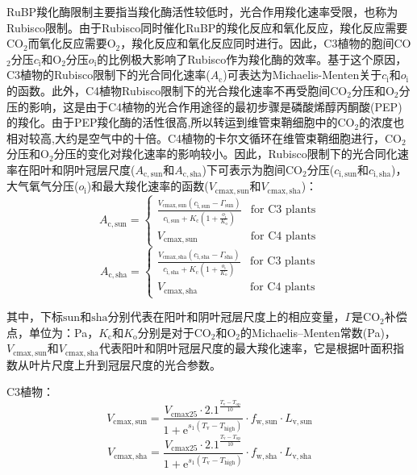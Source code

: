 RuBP羧化酶限制主要指当羧化酶活性较低时，光合作用羧化速率受限，也称为Rubisco限制。由于Rubisco同时催化RuBP的羧化反应和氧化反应，羧化反应需要CO$_2$而氧化反应需要O$_2$，羧化反应和氧化反应同时进行。因此，C3植物的胞间CO$_2$分压$c_{\mathrm {i}}$和O$_2$分压$o_{\mathrm {i}}$的比例极大影响了Rubisco作为羧化酶的效率。基于这个原因，C3植物的Rubisco限制下的光合同化速率($A_{\mathrm {c}}$)可表达为Michaelis-Menten关于$c_{\mathrm {i}}$和$o_{\mathrm {i}}$的函数。此外，C4植物Rubisco限制下的光合羧化速率不再受胞间CO$_2$分压和O$_2$分压的影响，这是由于C4植物的光合作用途径的最初步骤是磷酸烯醇丙酮酸(PEP)的羧化。由于PEP羧化酶的活性很高,所以转运到维管束鞘细胞中的CO$_2$的浓度也相对较高,大约是空气中的十倍。C4植物的卡尔文循环在维管束鞘细胞进行，CO$_2$分压和O$_2$分压的变化对羧化速率的影响较小。因此，Rubisco限制下的光合同化速率在阳叶和阴叶冠层尺度($A_{\mathrm{c,sun}}$和$A_{\mathrm{c,sha}}$)下可表示为胞间CO$_2$分压($c_{\mathrm{i,sun}}$和$c_{\mathrm{i,sha}}$)，大气氧气分压($o_{\mathrm{i}}$)和最大羧化速率的函数($V_{\mathrm{cmax,sun}}$和$V_{\mathrm{cmax,sha}}$)：
\begin{equation}\label{A_C1sun}
A_{\mathrm{c,sun}}=\begin{cases}
\frac{V_{\mathrm{cmax,sun}}\left(c_{\mathrm{i,sun}}-\Gamma_{\mathrm{sun}}\right)}{c_{\mathrm{i,sun}}+K_{\mathrm{c}}\left(1+\frac{o_{\mathrm{i}}}{K_{\mathrm{o}}}\right)}
     & \text{for C3 plants} \\
V_{\mathrm{cmax,sun }} & \text{for C4 plants}
\end{cases}
\end{equation}
\begin{equation}\label{A_C1sha}
A_{\mathrm{c,sha}}=\begin{cases}
\frac{V_{\mathrm{cmax,sha}}\left(c_{\mathrm{i,sha}}-\Gamma_{\mathrm{sha}}\right)}{c_{\mathrm{i,sha}}+K_{\mathrm{c}}\left(1+\frac{o_{\mathrm{i}}}{K_{\mathrm{o}}}\right)}
     & \text{for C3 plants} \\
V_{\mathrm{cmax,sha }} & \text{for C4 plants}
\end{cases}
\end{equation}

其中，下标${\mathrm {sun}}$和${\mathrm {sha}}$分别代表在阳叶和阴叶冠层尺度上的相应变量，$\Gamma$是CO$_2$补偿点，单位为：Pa，$K_{\mathrm {c}}$和$K_{\mathrm {o}}$分别是对于CO$_2$和O$_2$的Michaelis--Menten常数(Pa)，$V_{\mathrm{cmax,sun}}$和$V_{\mathrm{cmax,sha}}$代表阳叶和阴叶冠层尺度的最大羧化速率，它是根据叶面积指数从叶片尺度上升到冠层尺度的光合参数。

C3植物：
\begin{equation}\label{V_cmaxsun_a}
V_{\mathrm{cmax,sun }}=\frac{V_{\mathrm{cmax 25}} \cdot 2.1^{\frac{T_{\mathrm{{v }}}-T_{\mathrm{o p}}}{10}}}{1+{\mathrm e}^{s_{\mathrm{1}}\left(T_{\mathrm{{v }}}-T_{\mathrm{{high }}}\right)}} \cdot f_{\mathrm{w,sun}} \cdot L_{\mathrm{v,sun}}
\end{equation}
\begin{equation}\label{V_cmaxsha_a}
V_{\mathrm{cmax,sha }}=\frac{V_{\mathrm{cmax 25}} \cdot 2.1^{\frac{T_{\mathrm{{v }}}-T_{\mathrm{o p}}}{10}}}{1+{\mathrm e}^{s_{\mathrm{1}}\left(T_{\mathrm{{v }}}-T_{\mathrm{{high }}}\right)}} \cdot f_{\mathrm{w,sha}} \cdot L_{\mathrm{v,sha}}
\end{equation}

